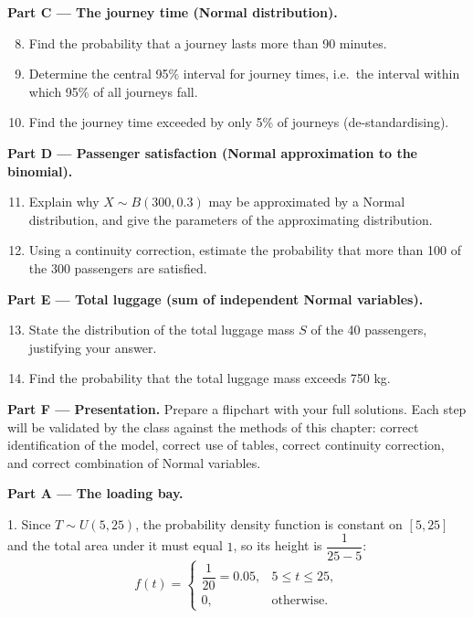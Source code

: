 \documentclass[11pt]{article}
\newcounter{popsec}
\newcounter{popsub}
\newcommand{\courssub}[1]{%
  \stepcounter{popsub}%
  \par\vspace{9pt}\noindent{\popxbold\fontsize{11.5}{13}\selectfont\color{popink}{\color{poporange}\thepopsec.\thepopsub}\hspace{6pt}#1}\par\nopagebreak\vspace{4pt}
}
\begin{document}
\textbf{Part C — The journey time (Normal distribution).}
\begin{enumerate}
\setcounter{enumi}{7}
\item Find the probability that a journey lasts more than 90 minutes.
\item Determine the central 95\% interval for journey times, i.e.\ the interval within which 95\% of all journeys fall.
\item Find the journey time exceeded by only 5\% of journeys (de-standardising).
\end{enumerate}

\textbf{Part D — Passenger satisfaction (Normal approximation to the binomial).}
\begin{enumerate}
\setcounter{enumi}{10}
\item Explain why $X \sim B(300, 0.3)$ may be approximated by a Normal distribution, and give the parameters of the approximating distribution.
\item Using a continuity correction, estimate the probability that more than 100 of the 300 passengers are satisfied.
\end{enumerate}

\textbf{Part E — Total luggage (sum of independent Normal variables).}
\begin{enumerate}
\setcounter{enumi}{12}
\item State the distribution of the total luggage mass $S$ of the 40 passengers, justifying your answer.
\item Find the probability that the total luggage mass exceeds 750 kg.
\end{enumerate}

\textbf{Part F — Presentation.} Prepare a flipchart with your full solutions. Each step will be validated by the class against the methods of this chapter: correct identification of the model, correct use of tables, correct continuity correction, and correct combination of Normal variables.

\courssub{Model answer}

\textbf{Part A — The loading bay.}\par
1. Since $T \sim U(5,25)$, the probability density function is constant on $[5,25]$ and the total area under it must equal $1$, so its height is $\dfrac{1}{25-5}$:
\[
f(t) = \begin{cases} \dfrac{1}{20} = 0.05, & 5 \le t \le 25, \\[2mm] 0, & \text{otherwise}. \end{cases}
\]
\end{document}
